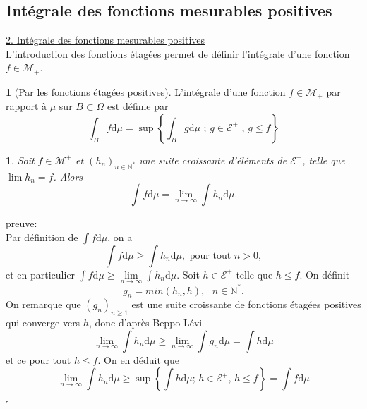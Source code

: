 \documentclass[8pt,notheorems]{beamer}
\def \N{\mathbb N}
\newtheorem{prop}{\translate{Proposition}}
\theoremstyle{definition}
\newtheorem{definition}{\translate{Definition}}
\theoremstyle{example}
\theoremstyle{mystyle}
\theoremstyle{plain}
\begin{document}
\subsection{Intégrale des fonctions mesurables positives}
\begin{frame}[allowframebreaks]
\underline{2. Intégrale des fonctions mesurables positives}\\
L'introduction des fonctions étagées permet de définir l'intégrale d'une fonction $f\in\mathcal{M}_{+}$.
\begin{definition}[Par les fonctions étagées positives]
L'intégrale d'une fonction $f\in\mathcal{M}_{+}$ par rapport à $\mu$ sur $B\subset\Omega$ est définie par
$$
\int_B f\text{d}\mu=\sup\left\{\int_B g\text{d}\mu\text{ ; }g\in\mathcal{E}^{+}\text{ , }g\leq f\right\}
$$
\end{definition}
\begin{prop}
Soit $f\in \mathcal{M}^+$ et $(h_n)_{n\in \N^\ast}$ une suite croissante d'éléments de $\mathcal{E}^+$, telle que $\lim h_n = f$. Alors 
$$
\int f\text{d} \mu = \underset{n\rightarrow \infty}{\lim}\int h_n\text{d} \mu.
$$
\end{prop}
\underline{preuve:}\\
Par définition de $\int f\text{d} \mu $, on a 
$$
\int f\text{d} \mu \geq \int h_n\text{d} \mu,\text{ pour tout }n>0,
$$
et en particulier $\int f\text{d} \mu \geq \underset{n\rightarrow\infty}{\lim} \int h_n\text{d} \mu$. Soit $h\in \mathcal{E}^+$ telle que $h\leq f$. On définit 
$$
g_n = min (h_n, h),\text{ }n\in \N^{\ast}.  
$$
On remarque que $(g_n)_{n\geq 1}$ est une suite croissante de fonctions étagées positives qui converge vers $h$, donc d'après Beppo-Lévi
$$
\underset{n\rightarrow \infty}{\lim}\int h_n\text{d}\mu\geq \underset{n\rightarrow \infty}{\lim} \int g_n\text{d}\mu = \int h\text{d}\mu
$$  
et ce pour tout $h\leq f$. On en déduit que 
$$
\underset{n\rightarrow \infty}{\lim}\int h_n\text{d}\mu \geq \sup \left\{\int h\text{d}\mu\text{; }h\in \mathcal{E}^+\text{, }h\leq f\right\} = \int f\text{d}\mu
$$

$\square$\\



\end{frame}
\end{document}
